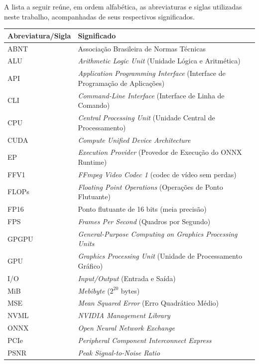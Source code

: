 \documentclass[
    12pt,                %
    openright,           %
    oneside,             %
    a4paper,             %
    english,             %
    brazil               %
]{abntex2}
\begin{document}
\noindent A lista a seguir reúne, em ordem alfabética, as abreviaturas e siglas utilizadas neste trabalho, acompanhadas de seus respectivos significados.

\vspace{\onelineskip}

\begin{table}[htb]
\centering
\begin{tabularx}{\textwidth}{@{}p{5.0cm}Y@{}}
\toprule
\textbf{Abreviatura/Sigla} & \textbf{Significado} \\
\midrule
ABNT  & Associação Brasileira de Normas Técnicas \\
ALU   & \textit{Arithmetic Logic Unit} (Unidade Lógica e Aritmética) \\
API   & \textit{Application Programming Interface} (Interface de Programação de Aplicações) \\
CLI   & \textit{Command-Line Interface} (Interface de Linha de Comando) \\
CPU   & \textit{Central Processing Unit} (Unidade Central de Processamento) \\
CUDA  & \textit{Compute Unified Device Architecture} \\
EP    & \textit{Execution Provider} (Provedor de Execução do ONNX Runtime) \\
FFV1  & \textit{FFmpeg Video Codec 1} (codec de vídeo sem perdas) \\
FLOPs & \textit{Floating Point Operations} (Operações de Ponto Flutuante) \\
FP16  & Ponto flutuante de 16 bits (meia precisão) \\
FPS   & \textit{Frames Per Second} (Quadros por Segundo) \\
GPGPU & \textit{General-Purpose Computing on Graphics Processing Units} \\
GPU   & \textit{Graphics Processing Unit} (Unidade de Processamento Gráfico) \\
I/O   & \textit{Input/Output} (Entrada e Saída) \\
MiB   & \textit{Mebibyte} ($2^{20}$ bytes) \\
MSE  & \textit{Mean Squared Error} (Erro Quadrático Médio) \\
NVML  & \textit{NVIDIA Management Library} \\
ONNX  & \textit{Open Neural Network Exchange} \\
PCIe  & \textit{Peripheral Component Interconnect Express} \\
PSNR  & \textit{Peak Signal-to-Noise Ratio} \\

\end{tabularx}
\end{table}
\end{document}
